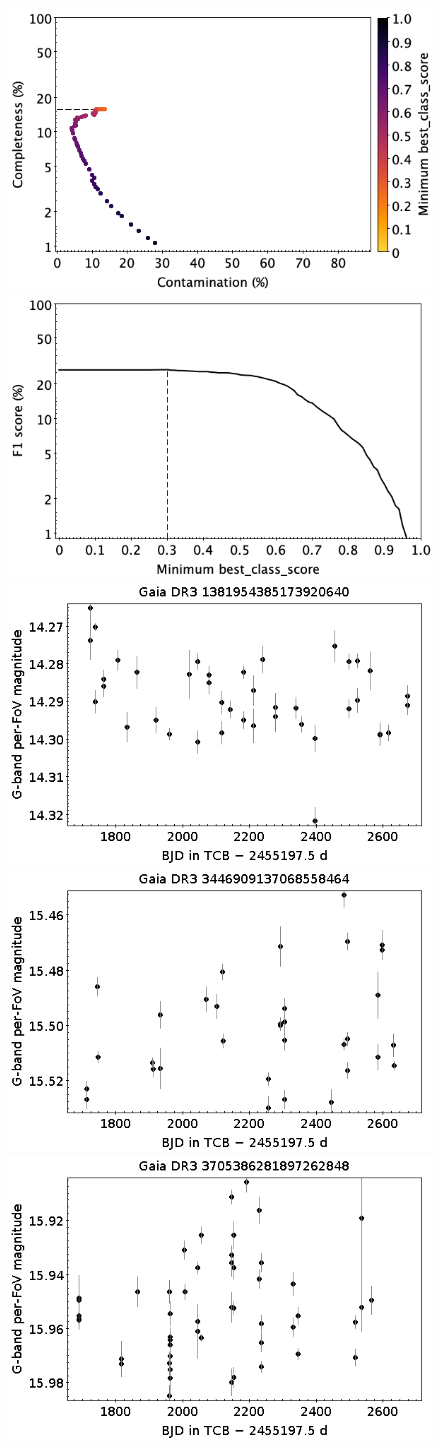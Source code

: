 \documentclass[longauth]{aa}
\begin{document}
\begin{appendix}
\begin{figure}
\centering
{} \includegraphics[width=0.45\hsize]{figures/appendix/WD_cls_scc.png}  
\hspace{2mm}
 \includegraphics[width=0.45\hsize]{figures/appendix/WD_cls_sf1.png} \\ 
\vspace{4mm}
 \includegraphics[width=0.45\hsize]{figures/appendix/WD-0-0p0016.png}  
\hspace{2mm}
 \includegraphics[width=0.45\hsize]{figures/appendix/WD-0-0p0031.png} \\
\vspace{4mm}
 \includegraphics[width=0.45\hsize]{figures/appendix/WD-0-0p0033.png}  

\end{figure}
\end{appendix}
\end{document}
